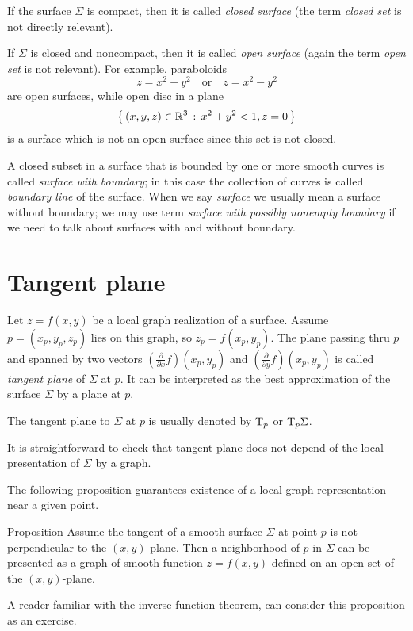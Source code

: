 If the surface $\Sigma$ is compact, then it is called \emph{closed surface} (the term \emph{closed set} is not directly relevant).

If $\Sigma$ is closed and noncompact, then it is called  \emph{open surface} (again the term \emph{open set} is not relevant).
For example, paraboloids 
\[z=x^2+y^2\quad\text{or}\quad z=x^2-y^2\]
are open surfaces, while
open disc in a plane 
\[\left\{\,{(x,y,z)\in\mathbb{R}^3}\,:\,{x^2+y^2<1, z=0}\,\right\}\]
is a surface which is not an open surface since this set is not closed. 

A closed subset in a surface that is bounded by one or more smooth curves is called \emph{surface with boundary}; in this case the collection of curves is called \emph{boundary line} of the surface.
When we say \emph{surface} we usually mean a surface without boundary;
we may use term \emph{surface with possibly nonempty boundary} if we need to talk about surfaces with and without boundary.

\section{Tangent plane}

Let $z=f(x,y)$ be a local graph realization of a surface. 
Assume $p=(x_p,y_p,z_p)$ lies on this graph, so $z_p=f(x_p,y_p)$.
The plane passing thru $p$ and spanned by two vectors $(\tfrac{\partial}{\partial x}f)(x_p,y_p)$ and  $(\tfrac{\partial}{\partial y}f)(x_p,y_p)$ is called \emph{tangent plane} of $\Sigma$ at $p$.
It can be interpreted as the best approximation of the surface $\Sigma$ by a plane at $p$.

The tangent plane to $\Sigma$ at $p$ is usually denoted by $\mathrm{T}_p$ or $\mathrm{T}_p\Sigma$.

It is straightforward to check that tangent plane does not depend of the local presentation of $\Sigma$ by a graph.

The following proposition guarantees existence of a local graph representation near a given point.

\begin{thm}{Proposition}\label{prop:perp}
Assume the tangent of a smooth surface $\Sigma$ at point $p$ is not perpendicular to the $(x,y)$-plane.
Then a neighborhood of $p$ in $\Sigma$ can be presented as a graph of smooth function $z=f(x,y)$ defined on an open set of the $(x,y)$-plane.
\end{thm}

A reader familiar with the inverse function theorem, can consider this proposition as an exercise.

